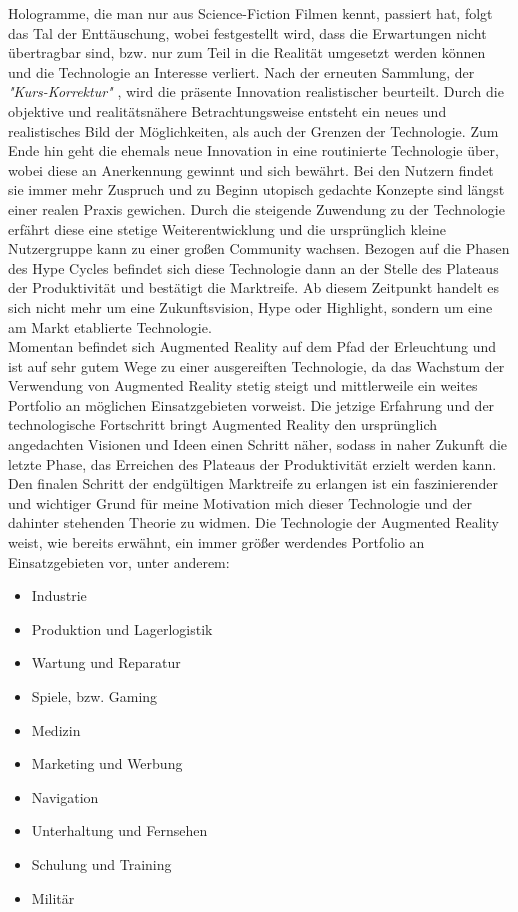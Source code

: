 Hologramme, die man nur aus Science-Fiction Filmen kennt, passiert hat, 
folgt das Tal der Enttäuschung, wobei festgestellt wird, dass die Erwartungen nicht übertragbar sind, bzw. nur zum Teil in die Realität 
umgesetzt werden können und die Technologie an Interesse verliert. Nach der erneuten Sammlung, der \textit{"Kurs-Korrektur"} 
\cite{hypecycle.2019o}, wird die präsente Innovation realistischer beurteilt. 
Durch die objektive und realitätsnähere Betrachtungsweise entsteht ein neues und realistisches Bild der Möglichkeiten, als auch 
der Grenzen der Technologie. Zum Ende hin geht die ehemals neue Innovation in eine routinierte Technologie über, wobei diese an 
Anerkennung gewinnt und sich bewährt. Bei den Nutzern findet sie immer mehr Zuspruch und zu Beginn utopisch gedachte Konzepte sind
längst einer realen Praxis gewichen. Durch die steigende Zuwendung zu der Technologie erfährt diese eine stetige Weiterentwicklung
und die ursprünglich kleine Nutzergruppe kann zu einer großen Community wachsen. Bezogen auf die Phasen des Hype Cycles befindet sich diese 
Technologie dann an der Stelle des Plateaus der Produktivität und bestätigt die Marktreife. Ab diesem Zeitpunkt handelt es sich nicht mehr 
um eine Zukunftsvision, Hype oder Highlight, sondern um eine am Markt etablierte Technologie.
\\ 
\linebreak
Momentan befindet sich Augmented Reality auf dem Pfad der Erleuchtung und ist auf sehr gutem Wege zu einer ausgereiften Technologie, 
da das Wachstum der Verwendung von Augmented Reality stetig steigt und mittlerweile ein weites Portfolio an möglichen Einsatzgebieten 
vorweist. Die jetzige Erfahrung und der technologische Fortschritt bringt Augmented Reality den ursprünglich angedachten Visionen und Ideen 
einen Schritt näher, sodass in naher Zukunft die letzte Phase, das Erreichen des Plateaus der Produktivität erzielt werden kann. Den finalen 
Schritt der endgültigen Marktreife zu erlangen ist ein faszinierender und wichtiger Grund für meine Motivation mich dieser Technologie und 
der dahinter stehenden Theorie zu widmen. 
Die Technologie der Augmented Reality weist, wie bereits erwähnt, ein immer größer werdendes Portfolio an Einsatzgebieten vor, unter anderem: 
\begin{itemize}
    \item Industrie 
    \item Produktion und Lagerlogistik
    \item Wartung und Reparatur
    \item Spiele, bzw. Gaming 
    \item Medizin
    \item Marketing und Werbung
    \item Navigation
    \item Unterhaltung und Fernsehen 
    \item Schulung und Training
    \item Militär
\end{itemize} 
